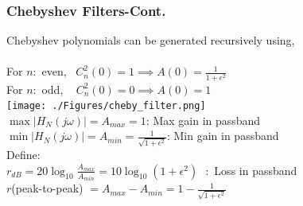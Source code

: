 \documentclass[mathserif, 10pt]{beamer} %
\begin{document}
\frame
{
\small
\frametitle{Chebyshev Filters-Cont.}

Chebyshev polynomials can be generated recursively using, \\
\\
For $n:$ even, ~$C_n^2(0) = 1 \implies A(0) = \frac{1}{1+\epsilon^2}$\\
For $n:$ odd, ~ $C_n^2(0) = 0\implies A(0)  = 1$\\
\texttt{[image: ./Figures/cheby\_filter.png]}\\
$\max |H_N(j\omega)| = A_{max} =1$:  Max gain in passband\\
$\min |H_N(j\omega)| = A_{min} = \frac{1}{\sqrt{1+\epsilon^2}}$: Min gain in passband\\
Define: \\
$r_{dB} = 20 \log_{10} \frac{A_{max}}{A_{min}} = 10 \log_{10}{(1+\epsilon^2)}~~~:$ Loss in passband\\
$r$(peak-to-peak) $= A_{max}-A_{min}=1-\frac{1}{\sqrt{1+\epsilon^2}}$


}
\end{document}
